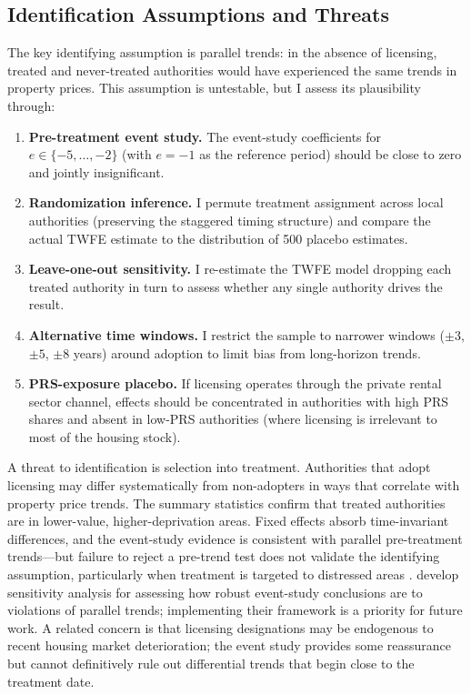 \documentclass[12pt]{article}
\begin{document}
\subsection{Identification Assumptions and Threats}

The key identifying assumption is parallel trends: in the absence of licensing, treated and never-treated authorities would have experienced the same trends in property prices. This assumption is untestable, but I assess its plausibility through:

\begin{enumerate}
    \item \textbf{Pre-treatment event study.} The \citet{callaway2021difference} event-study coefficients for $e \in \{-5, \ldots, -2\}$ (with $e = -1$ as the reference period) should be close to zero and jointly insignificant.

    \item \textbf{Randomization inference.} I permute treatment assignment across local authorities (preserving the staggered timing structure) and compare the actual TWFE estimate to the distribution of 500 placebo estimates.

    \item \textbf{Leave-one-out sensitivity.} I re-estimate the TWFE model dropping each treated authority in turn to assess whether any single authority drives the result.

    \item \textbf{Alternative time windows.} I restrict the sample to narrower windows ($\pm 3$, $\pm 5$, $\pm 8$ years) around adoption to limit bias from long-horizon trends.

    \item \textbf{PRS-exposure placebo.} If licensing operates through the private rental sector channel, effects should be concentrated in authorities with high PRS shares and absent in low-PRS authorities (where licensing is irrelevant to most of the housing stock).
\end{enumerate}

A threat to identification is selection into treatment. Authorities that adopt licensing may differ systematically from non-adopters in ways that correlate with property price trends. The summary statistics confirm that treated authorities are in lower-value, higher-deprivation areas. Fixed effects absorb time-invariant differences, and the event-study evidence is consistent with parallel pre-treatment trends---but failure to reject a pre-trend test does not validate the identifying assumption, particularly when treatment is targeted to distressed areas \citep{roth2022pretest}. \citet{rambachan2023more} develop sensitivity analysis for assessing how robust event-study conclusions are to violations of parallel trends; implementing their framework is a priority for future work. A related concern is that licensing designations may be endogenous to recent housing market deterioration; the event study provides some reassurance but cannot definitively rule out differential trends that begin close to the treatment date.
\end{document}
